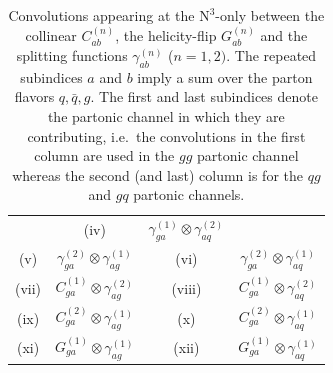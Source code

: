 \documentclass[12pt]{article}
\DeclareRobustCommand{\LO}{\text{LO}\xspace}
\DeclareRobustCommand{\N}[1]{\ensuremath{\text{N}^{#1}}} %
\begin{document}
\begin{appendix}
\begin{table}
\begin{tabular}{ |c|c||c|c| }
& \multirow{1}{*}{(iv)} 

& $\gamma^{(1)}_{ga}\otimes\gamma^{(2)}_{aq}$  \\

\multirow{1}{*}{(v)} 

& $\gamma^{(2)}_{ga}\otimes\gamma^{(1)}_{ag}$

& \multirow{1}{*}{(vi)} 

& $\gamma^{(2)}_{ga}\otimes\gamma^{(1)}_{aq}$  \\

\multirow{1}{*}{(vii)} 

& $C^{(1)}_{ga}\otimes\gamma^{(2)}_{ag}$

& \multirow{1}{*}{(viii)} 

& $C^{(1)}_{ga}\otimes\gamma^{(2)}_{aq}$  \\

\multirow{1}{*}{(ix)} 

& $C^{(2)}_{ga}\otimes\gamma^{(1)}_{ag}$

& \multirow{1}{*}{(x)} 

& $C^{(2)}_{ga}\otimes\gamma^{(1)}_{aq}$  \\

\multirow{1}{*}{(xi)} 

& $G^{(1)}_{ga}\otimes\gamma^{(1)}_{ag}$

& \multirow{1}{*}{(xii)} 

& $G^{(1)}_{ga}\otimes\gamma^{(1)}_{aq}$  \\

\hline
\end{tabular}
\caption{\label{Table:convosN3LO}
{Convolutions appearing at the \N3\LO-only between the collinear $C^{(n)}_{ab}$, the helicity-flip $G^{(n)}_{ab}$ and the splitting functions $\gamma^{(n)}_{ab}$ ($n=1,2)$. The repeated subindices $a$ and $b$ imply a sum over the parton flavors $q,\bar{q},g$.  The first and last subindices denote the partonic channel in which they are contributing, i.e.\ the convolutions in the first column are used in the $gg$ partonic channel whereas the second (and last) column is for the $qg$ and $gq$ partonic channels.
}}
\renewcommand{\arraystretch}{1}
\end{table}


\end{appendix}
\end{document}

